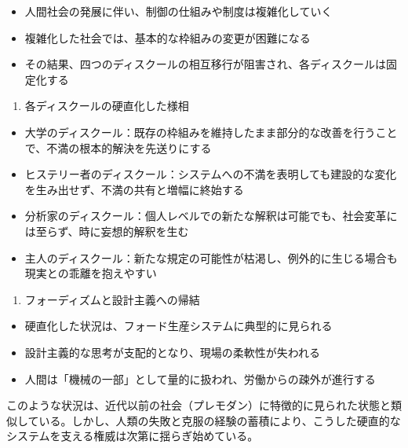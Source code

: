 \begin{itemize}
\tightlist
\item
  人間社会の発展に伴い、制御の仕組みや制度は複雑化していく
\item
  複雑化した社会では、基本的な枠組みの変更が困難になる
\item
  その結果、四つのディスクールの相互移行が阻害され、各ディスクールは固定化する
\end{itemize}

\begin{enumerate}
\def\labelenumi{\arabic{enumi}.}
\setcounter{enumi}{1}
\tightlist
\item
  各ディスクールの硬直化した様相
\end{enumerate}

\begin{itemize}
\tightlist
\item
  \mbox{大学のディスクール}：既存の枠組みを維持したまま部分的な改善を行うことで、不満の根本的解決を先送りにする
\item
  \mbox{ヒステリー者のディスクール}：システムへの不満を表明しても建設的な変化を生み出せず、不満の共有と増幅に終始する
\item
  \mbox{分析家のディスクール}：個人レベルでの新たな解釈は可能でも、社会変革には至らず、時に妄想的解釈を生む
\item
  \mbox{主人のディスクール}：新たな規定の可能性が枯渇し、例外的に生じる場合も現実との乖離を抱えやすい
\end{itemize}

\begin{enumerate}
\def\labelenumi{\arabic{enumi}.}
\setcounter{enumi}{2}
\tightlist
\item
  フォーディズムと設計主義への帰結
\end{enumerate}

\begin{itemize}
\tightlist
\item
  硬直化した状況は、フォード生産システムに典型的に見られる
\item
  設計主義的な思考が支配的となり、現場の柔軟性が失われる
\item
  人間は「機械の一部」として量的に扱われ、労働からの疎外が進行する
\end{itemize}

このような状況は、近代以前の社会（\mbox{プレモダン}）に特徴的に見られた状態と類似している。しかし、人類の失敗と克服の経験の蓄積により、こうした硬直的なシステムを支える権威は次第に揺らぎ始めている。
